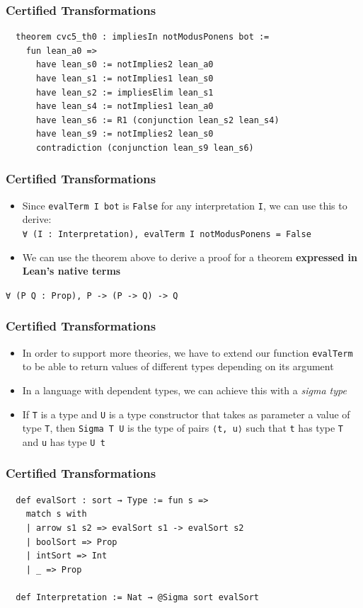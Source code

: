 \documentclass[usepdftitle=false,aspectratio=169,usenames,dvipsnames]{beamer}
\newcommand\vitem{\vfill\item}
\begin{document}
\begin{frame}[fragile]
  \frametitle{Certified Transformations}
  \begin{verbatim}
  theorem cvc5_th0 : impliesIn notModusPonens bot :=
    fun lean_a0 =>
      have lean_s0 := notImplies2 lean_a0
      have lean_s1 := notImplies1 lean_s0
      have lean_s2 := impliesElim lean_s1
      have lean_s4 := notImplies1 lean_a0
      have lean_s6 := R1 (conjunction lean_s2 lean_s4)
      have lean_s9 := notImplies2 lean_s0
      contradiction (conjunction lean_s9 lean_s6)
  \end{verbatim}
\end{frame}


\begin{frame}
  \frametitle{Certified Transformations}
  \begin{itemize}
    \item Since \texttt{evalTerm I bot} is \texttt{False} for any interpretation \texttt{I}, we can use this to derive:\\ \texttt{∀ (I : Interpretation), evalTerm I notModusPonens = False}
    \vitem We can use the theorem above to derive a proof for a theorem \textbf{expressed in Lean's native terms}
  \end{itemize}
  \vfill
  \centering
    \texttt{∀ (P Q : Prop), P -> (P -> Q) -> Q}
\end{frame}

\begin{frame}
  \frametitle{Certified Transformations}
  \begin{itemize}
    \item In order to support more theories, we have to extend our function \texttt{evalTerm} to be able to return values of different types depending on its argument
    \vitem In a language with dependent types, we can achieve this with a \textit{sigma type}
    \vitem If \texttt{T} is a type and \texttt{U} is a type constructor that takes as parameter a value of type \texttt{T}, then \texttt{Sigma T U} is the type of pairs \texttt{⟨t, u⟩} such that \texttt{t} has type \texttt{T} and \texttt{u} has type \texttt{U t}
  \end{itemize}
\end{frame}

\begin{frame}[fragile]
  \frametitle{Certified Transformations}
  \begin{verbatim}
  def evalSort : sort → Type := fun s =>
    match s with
    | arrow s1 s2 => evalSort s1 -> evalSort s2
    | boolSort => Prop
    | intSort => Int
    | _ => Prop

  def Interpretation := Nat → @Sigma sort evalSort
  \end{verbatim}
\end{frame}
\end{document}
